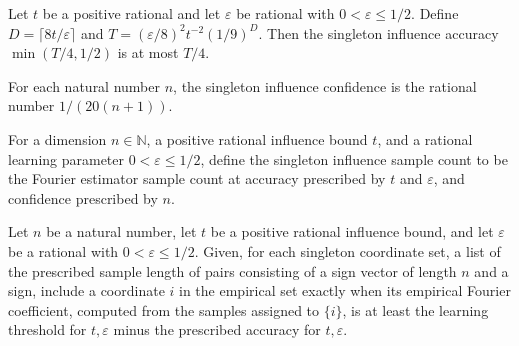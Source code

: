 \begin{theorem}
\label{FABL.singletonInfluenceAccuracy_le_quarter_threshold}
\leanok
{}
Let $t$ be a positive rational and let $\varepsilon$ be rational with $0<\varepsilon\le
1/2$. Define $D=\lceil 8t/\varepsilon\rceil$ and $T=(\varepsilon/8)^2t^{-2}(1/9)^D$.
Then the singleton influence accuracy $\min(T/4,1/2)$ is at most $T/4$.
\end{theorem}

\begin{definition}
\label{FABL.singletonInfluenceConfidence}
\leanok
{}
For each natural number $n$, the singleton influence confidence is the rational number
$1/(20(n+1))$.
\end{definition}

\begin{definition}
\label{FABL.singletonInfluenceSampleCount}
\leanok
{}
For a dimension $n\in\mathbb{N}$, a positive rational influence bound $t$, and a
rational learning parameter $0<\varepsilon\leq 1/2$, define the singleton influence
sample count to be the Fourier estimator sample count at accuracy prescribed by $t$ and
$\varepsilon$, and confidence prescribed by $n$.
\end{definition}

\begin{definition}
\label{FABL.empiricalInfluentialCoordinatesUncapped}
\leanok
{}
Let $n$ be a natural number, let $t$ be a positive rational influence bound, and let
$\varepsilon$ be a rational with $0<\varepsilon\le 1/2$. Given, for each singleton
coordinate set, a list of the prescribed sample length of pairs consisting of a sign
vector of length $n$ and a sign, include a coordinate $i$ in the empirical set exactly
when its empirical Fourier coefficient, computed from the samples assigned to $\{i\}$,
is at least the learning threshold for $t,\varepsilon$ minus the prescribed accuracy for
$t,\varepsilon$.
\end{definition}

